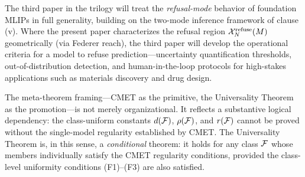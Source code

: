 The third paper in the trilogy will treat the \emph{refusal-mode} behavior of foundation MLIPs in full generality, building on the two-mode inference framework of clause (v). Where the present paper characterizes the refusal region $\mathcal{X}_N^{\text{refuse}}(M)$ geometrically (via Federer reach), the third paper will develop the operational criteria for a model to refuse prediction---uncertainty quantification thresholds, out-of-distribution detection, and human-in-the-loop protocols for high-stakes applications such as materials discovery and drug design.

\begin{remark}
The meta-theorem framing---CMET as the primitive, the Universality Theorem as the promotion---is not merely organizational. It reflects a substantive logical dependency: the class-uniform constants $d(\mathcal{F})$, $\rho(\mathcal{F})$, and $r(\mathcal{F})$ cannot be proved without the single-model regularity established by CMET. The Universality Theorem is, in this sense, a \emph{conditional} theorem: it holds for any class $\mathcal{F}$ whose members individually satisfy the CMET regularity conditions, provided the class-level uniformity conditions (F1)--(F3) are also satisfied.
\end{remark}
